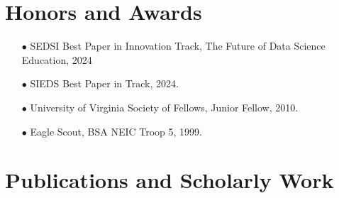 \documentclass{article}[10pt]
\begin{document}
\section*{Honors and Awards}
\begin{itemize}
\item [$\bullet$] SEDSI Best Paper in Innovation Track, The Future of Data Science Education, 2024
\item [$\bullet$] SIEDS Best Paper in Track, 2024.
\item [$\bullet$] University of Virginia Society of Fellows, Junior Fellow, 2010.
\item [$\bullet$] Eagle Scout, BSA NEIC Troop 5, 1999.
\end{itemize}


\section*{Publications and Scholarly Work}
\end{document}
